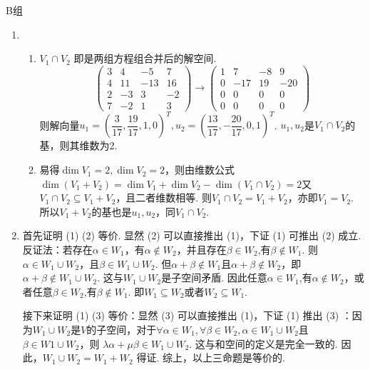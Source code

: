 \centerline{\heiti B组}
\begin{enumerate}
    \item \begin{enumerate}
              \item $V_1\cap V_2$ 即是两组方程组合并后的解空间.
                    \[\begin{pmatrix}
                            3 & 4  & -5  & 7  \\
                            4 & 11 & -13 & 16 \\
                            2 & -3 & 3   & -2 \\
                            7 & -2 & 1   & 3
                        \end{pmatrix}\rightarrow
                        \begin{pmatrix}1 & 7   & -8 & 9   \\
               0 & -17 & 19 & -20 \\
               0 & 0   & 0  & 0   \\
               0 & 0   & 0  & 0
                        \end{pmatrix}\]
                    则解向量$u_1=\left(\dfrac {3}{17},\dfrac{19}{17},1,0\right)^T,u_2=\left(\dfrac{13}{17},-\dfrac{20}{17},0,1\right)^T$. $u_1,u_2$是$V_1\cap V_2$的基，则其维数为2.

              \item 易得$\dim V_1=2,\dim V_2=2$，则由维数公式$\dim (V_1+V_2)=\dim V_1+\dim V_2-\dim (V_1\cap V_2)= 2$又$V_1\cap V_2\subseteq V_1+V_2$，且二者维数相等. 则$V_1\cap V_2=V_1+V_2$，亦即$V_1=V_2$. 所以$V_1+V_2$的基也是$u_1,u_2$，同$V_1\cap V_2$.
          \end{enumerate}

    \item 首先证明 (1) (2) 等价. 显然 (2) 可以直接推出 (1)，下证 (1) 可推出 (2) 成立. 反证法：若存在$\alpha\in W_1$，有$\alpha\not\in W_2$，并且存在$\beta \in W_2$,有$\beta \not\in W_1$. 则$\alpha\in W_1\cup W_2$，且$\beta \in W_1\cup W_2$. 但$\alpha+\beta \not\in W_1$且$\alpha+\beta \not\in W_2$，即$\alpha+\beta \not\in W_1\cup W_2$. 这与$W_1\cup W_2$是子空间矛盾. 因此任意$\alpha\in W_1$,有$\alpha\not\in W_2$，或者任意$\beta \in W_2$,有$\beta\not\in W_1$. 即$W_1\subseteq W_2$或者$W_2\subseteq W_1$.

          接下来证明 (1) (3) 等价：显然 (3) 可以直接推出 (1)，下证 (1) 推出 (3) ：因为$W_1\cup W_2$是$V$的子空间，对于$\forall\alpha\in W_1,\forall	\beta \in W_2,\alpha\in W_1\cup W_2$且$\beta \in W1\cup W_2$，则 $\lambda\alpha+\mu\beta\in W_1\cup W_2$. 这与和空间的定义是完全一致的. 因此，$W_1\cup W_2=W_1+W_2$ 得证. 综上，以上三命题是等价的.


\end{enumerate}
